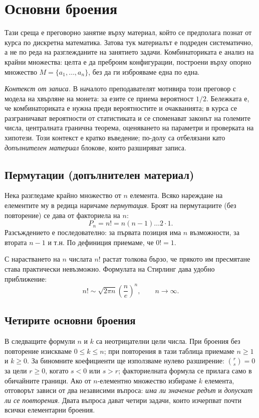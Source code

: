 \section{Основни броения}
Тази среща е преговорно занятие върху материал, който се предполага познат от курса по
дискретна математика. Затова тук материалът е подреден систематично, а не по реда на
разглежданите на занятието задачи. Комбинаториката е анализ на крайни множества: целта е
да преброим конфигурации, построени върху опорно множество $M = \{a_1, \dots, a_n\}$,
без да ги изброяваме една по една.

\emph{Контекст от записа.} В началото преподавателят мотивира този преговор с модела на хвърляне на монета: за езите се приема вероятност $1/2$. Бележката е, че комбинаториката е нужна преди вероятностите и очакванията; в курса се разграничават вероятности от статистиката и се споменават законът на големите числа, централната гранична теорема, оценяването на параметри и проверката на хипотези. Този контекст е кратко въведение; по-долу са отбелязани като \emph{\textnormal{допълнителен материал}} блокове, които разширяват записа.

\subsection{Пермутации \textnormal{(допълнителен материал)}}
Нека разгледаме крайно множество от $n$ елемента. Всяко нареждане на елементите му в
редица наричаме \emph{пермутация}. Броят на пермутациите (без повторение) се дава от
факториела на $n$:
\[ P_n = n! = n(n-1) \dots 2 \cdot 1 . \]
Разсъждението е последователно: за първата позиция има $n$ възможности, за втората $n-1$
и т.н. По дефиниция приемаме, че $0! = 1$.

\begin{supp}\label{supp:stirling}
С нарастването на $n$ числата $n!$ растат толкова бързо, че прякото им пресмятане
става практически невъзможно. Формулата на Стирлинг дава удобно приближение:
\[ n! \sim \sqrt{2\pi n}\left(\frac{n}{e}\right)^{n}, \qquad n \to \infty . \]
\end{supp}

\subsection{Четирите основни броения}
В следващите формули $n$ и $k$ са неотрицателни цели числа. При броения без повторение изискваме $0\le k\le n$; при повторения в тази таблица приемаме $n\ge1$ и $k\ge0$. За биномните коефициенти ще използваме нулево разширение: $\binom{r}{s}=0$ за цели $r\ge0$, когато $s<0$ или $s>r$; факториелната формула се прилага само в обичайните граници.
Ако от $n$-елементно множество избираме $k$ елемента, отговорът зависи от два независими
въпроса: \emph{има ли значение редът} и \emph{допускат ли се повторения}. Двата въпроса
дават четири задачи, които изчерпват почти всички елементарни броения.

